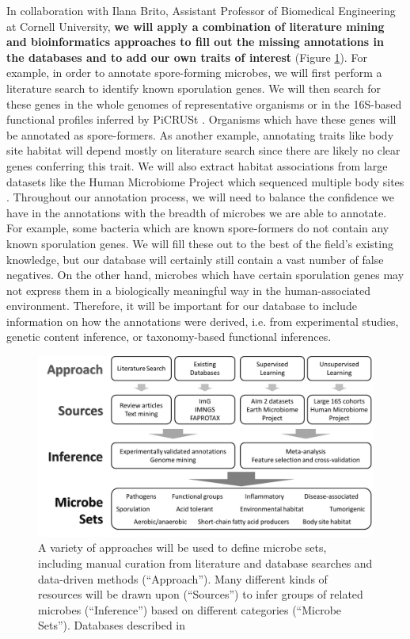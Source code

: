 \documentclass[12pt]{article}
\begin{document}
In collaboration with Ilana Brito, Assistant Professor of Biomedical Engineering at Cornell University, 
\textbf{we will apply a combination of literature mining and bioinformatics approaches to fill 
out the missing annotations in the databases and to add our own traits
of interest} (Figure \ref{fig:microbe_sets}). 
For example, in order to annotate spore-forming microbes, we will first perform a literature
search to identify known sporulation genes. We will then search for these genes in 
the whole genomes of representative organisms or in the 16S-based functional
profiles inferred by PiCRUSt \cite{langille-picrust-2013}.
Organisms which have these genes will be annotated as spore-formers. 
As another example, annotating traits like body site habitat will 
depend mostly on literature search since there are likely no clear genes
conferring this trait. We will also extract habitat associations
from large datasets like the Human Microbiome Project which sequenced multiple body sites \cite{hmp-2012}.
Throughout our annotation process, we will need to balance
the confidence we have in the annotations with
the breadth of microbes we are able to annotate.
For example, some bacteria which are known spore-formers do not contain any
known sporulation genes. We will fill these out to the best of the field's
existing knowledge, but our database will certainly 
still contain a vast number of false negatives.
On the other hand, microbes which have certain sporulation genes
may not express them in a biologically meaningful way in the human-associated
environment. Therefore, it will be important for our database to include information
on how the annotations were derived, i.e. from experimental studies, genetic content 
inference, or taxonomy-based functional inferences.

\begin{figure}
\begin{center}
	\includegraphics[scale=0.4]{microbe_sets}
	\caption{A variety of approaches will be used to define
	microbe sets, including manual curation from literature
	and database searches and data-driven methods (``Approach'').
	Many different kinds of resources will be drawn upon 
	(``Sources'') to infer groups of related microbes 
	(``Inference'') based on different categories 
	(``Microbe Sets''). Databases described in \cite{markowitz-img-2013, louca-faprotax-2016, lagkouvardos-imngs-2016}}
	\label{fig:microbe_sets}
\end{center}
\end{figure}
\end{document}
